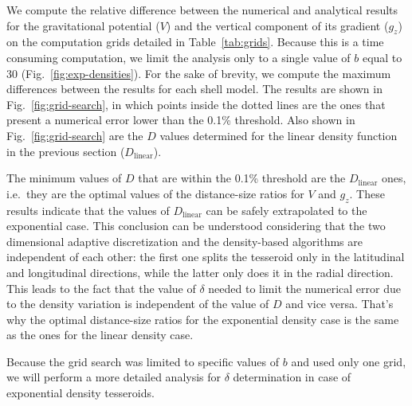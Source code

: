 \documentclass[extra, referee]{gji}
\begin{document}
We compute the relative difference between the numerical and analytical results for the
gravitational potential ($V$) and the vertical component of its gradient ($g_z$) on the
computation grids detailed in Table~\ref{tab:grids}.
Because this is a time consuming computation, we limit the analysis only to a single
value of $b$ equal to 30 (Fig.~\ref{fig:exp-densities}).
For the sake of brevity, we compute the maximum differences between the results for each
shell model.
The results are shown in Fig.~\ref{fig:grid-search}, in which points inside the dotted
lines are the ones that present a numerical error lower than the 0.1\% threshold.
Also shown in Fig.~\ref{fig:grid-search} are the $D$ values determined for the linear
density function in the previous section ($D_\text{linear}$).

The minimum values of $D$ that are within the 0.1\% threshold are the $D_\text{linear}$
ones, i.e.~they are the optimal values of the distance-size ratios for $V$ and $g_z$.
These results indicate that the values of $D_\text{linear}$ can be safely extrapolated
to the exponential case.
This conclusion can be understood considering that the two dimensional adaptive
discretization and the density-based algorithms are independent of each other: the first
one splits the tesseroid only in the latitudinal and longitudinal directions, while the
latter only does it in the radial direction.
This leads to the fact that the value of $\delta$ needed to limit the numerical error
due to the density variation is independent of the value of $D$ and vice versa.
That's why the optimal distance-size ratios for the exponential density case is the same
as the ones for the linear density case.

Because the grid search was limited to specific values of $b$ and used only one grid, we
will perform a more detailed analysis for $\delta$ determination in case of exponential
density tesseroids.
\end{document}
